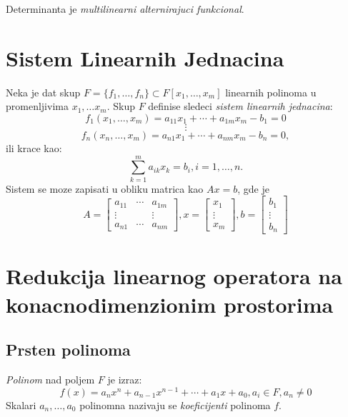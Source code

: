 \documentclass[12p,a4paper]{article}
\begin{document}
\begin{multicols}{2}
    Determinanta je \textit{multilinearni alternirajuci funkcional}.


\section{Sistem Linearnih Jednacina}

    Neka je dat skup $F = \{f_1, \ldots, f_n\} \subset F[ x_1, \ldots, x_m ]$
    linearnih polinoma u promenljivima $x_1, \ldots x_m$. Skup $F$ definise 
    sledeci \textit{sistem linearnih jednacina}:
    \[f_1(x_1, \ldots, x_m) = a_{11}x_1 + \cdots + a_{1m}x_m - b_1 = 0\]
    \[\vdots\]
    \[f_n(x_n, \ldots, x_m) = a_{n1}x_1 + \cdots + a_{nm}x_m - b_n = 0,\]
    ili krace kao:
    \[\sum_{k=1}^m a_{ik}x_k= b_i, i=1,\ldots,n.\]
    Sistem se moze zapisati u obliku matrica kao $Ax = b$, gde je
    \[
        A = 
        \begin{bmatrix}
            a_{11} & \cdots & a_{1m} \\
            \vdots & &        \vdots \\
            a_{n1} & \cdots & a_{nm} 
        \end{bmatrix},
        x = 
        \begin{bmatrix}
            x_1     \\
            \vdots  \\
            x_m
        \end{bmatrix},
        b = 
        \begin{bmatrix}
            b_1     \\
            \vdots  \\
            b_n
        \end{bmatrix}
    \]

\section{Redukcija linearnog operatora na konacnodimenzionim prostorima}

\subsection{Prsten polinoma}

    \textit{Polinom} nad poljem $F$ je izraz:
    \[
        f(x) = a_n x^n + a_{n-1} x^{n-1} + \cdots + a_1 x + a_0, 
        a_i \in F, a_n \neq 0
    \]
    Skalari $a_n, \ldots, a_0$ polinomna nazivaju se \textit{koeficijenti} 
    polinoma $f$.


\end{multicols}
\end{document}

